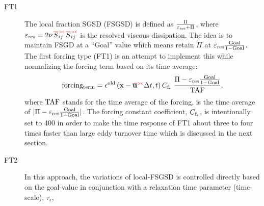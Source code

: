 \begin{description}
%
  \item[FT1]{   The local fraction SGSD (FSGSD) is defined as
               $\frac{\Pi }  {  \varepsilon_{\rm res}  +  \Pi }$,
               where \linebreak[4]
               \mbox{$\varepsilon_{\rm res} = 2 \nu
               {{\left.\red\overline{\bl S}_{\bl ij} \rule{-8pt}{6pt}\right.}^{\red {\scriptscriptstyle >} \epsilon}}
               {{\left.\red\overline{\bl S}_{\bl ij} \rule{-8pt}{6pt}\right.}^{\red {\scriptscriptstyle >} \epsilon}}$}
               is the resolved viscous dissipation.
               The idea is to maintain FSGD at a ``Goal'' value which means retain $\Pi$ at
               $\varepsilon_{\rm res} \frac {\rm Goal}{1-{\rm Goal}}$.
               The first forcing type (FT1) is an attempt to implement this while normalizing the forcing term based on its time average:
%
              \begin{equation}
                  \label{eq:FT1_3} \vspace*{3pt}
                  {\rm  forcing_{term} } =
                  \epsilon^{\rm old} \left( {\mathbf x}-\bareps[{\mathbf u}] \Delta t,t\right)
                  C_{{\rm f}_{\epsilon}} \;
                  \frac {\Pi - \varepsilon_{\rm res}  \frac {\rm Goal}{1-{\rm Goal}}} {\rm TAF} ,
              \end{equation}
%
             \noindent
             where ${\rm TAF}$ stands for the time average of the forcing, is the time average of
             $|\Pi - \varepsilon_{\rm res}  \frac {\rm Goal}{1-{\rm Goal}}|$.
             The forcing constant coefficient, $C_{{\rm f}_{\epsilon}}$, is intentionally set to 400
             in order to make the time response of FT1 about three to four times faster than
             large eddy turnover time which is discussed in the next section.
}
 \vspace{6pt}
  \item[FT2]{   In this approach, the variations of local-FSGSD is controlled directly based on the goal-value
               in conjunction with a relaxation time parameter (time-scale), $\tau_{\epsilon}$,
%
               \begin{equation}

\end{equation}}
\end{description}
